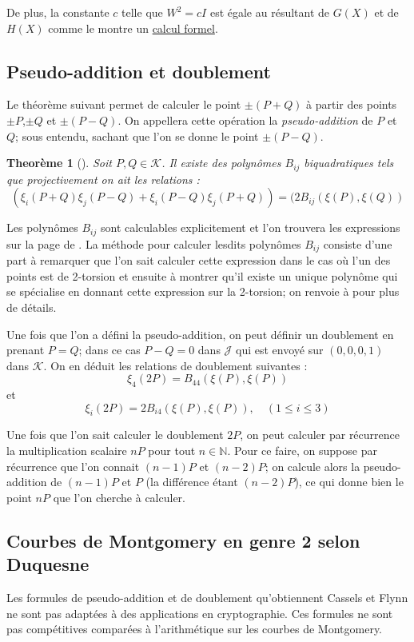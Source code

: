 \documentclass[a4paper,12pt]{article}
\newtheorem{theoreme}{Theorème}[section]
\theoremstyle{definition}
\theoremstyle{remark}
\numberwithin{equation}{section}
\begin{document}
De plus, la constante $c$ telle que $W^2 = cI$ est égale au résultant de $G(X)$ et de $H(X)$ comme le montre un \href{run:./add2tors.sag}{calcul formel}.

\subsection{Pseudo-addition et doublement}
Le théorème suivant permet de calculer le point $\pm (P+Q)$ à partir des points $\pm P$,$\pm Q$ et $\pm(P-Q)$. On appellera cette opération la \emph{pseudo-addition} de $P$ et $Q$; sous entendu, sachant que l'on se donne le point $\pm(P-Q)$.

\begin{theoreme}[\citet{cassels-Flynn}]
Soit $P,Q \in \mathcal{K}$. Il existe des polynômes $B_{ij}$ biquadratiques tels que projectivement on ait les relations :
$$(\xi_i(P+Q)\xi_j(P-Q) + \xi_i(P-Q)\xi_j(P+Q)) = (2B_{ij}(\xi(P),\xi(Q))$$
\end{theoreme}

Les polynômes $B_{ij}$ sont calculables explicitement et l'on trouvera les expressions sur la page de \citet{biquad}. La méthode pour calculer lesdits polynômes $B_{ij}$ consiste d'une part à remarquer que l'on sait calculer cette expression dans le cas où l'un des points est de 2-torsion et ensuite à montrer qu'il existe un unique polynôme qui se spécialise en donnant cette expression sur la 2-torsion; on renvoie à \citep{cassels-Flynn} pour plus de détails.

Une fois que l'on a défini la pseudo-addition, on peut définir un doublement en prenant $P=Q$; dans ce cas $P-Q = 0$ dans $\mathcal{J}$ qui est envoyé sur $(0,0,0,1)$ dans $\mathcal{K}$. On en déduit les relations de doublement suivantes :
$$\xi_4(2P) = B_{44}(\xi(P),\xi(P))$$
et
$$\xi_i(2P) = 2B_{i4}(\xi(P),\xi(P)), \quad (1\leq i \leq 3)$$

Une fois que l'on sait calculer le doublement $2P$, on peut calculer par récurrence la multiplication scalaire $nP$ pour tout $n\in\mathbb{N}$. Pour ce faire, on suppose par récurrence que l'on connait $(n-1)P$ et $(n-2)P$; on calcule alors la pseudo-addition de $(n-1)P$ et $P$ (la différence étant $(n-2)P$), ce qui donne bien le point $nP$ que l'on cherche à calculer.

\subsection{Courbes de Montgomery en genre 2 selon Duquesne}
Les formules de pseudo-addition et de doublement qu'obtiennent Cassels et Flynn ne sont pas adaptées à des applications en cryptographie. Ces formules ne sont pas compétitives comparées à l'arithmétique sur les courbes de Montgomery.
\end{document}
